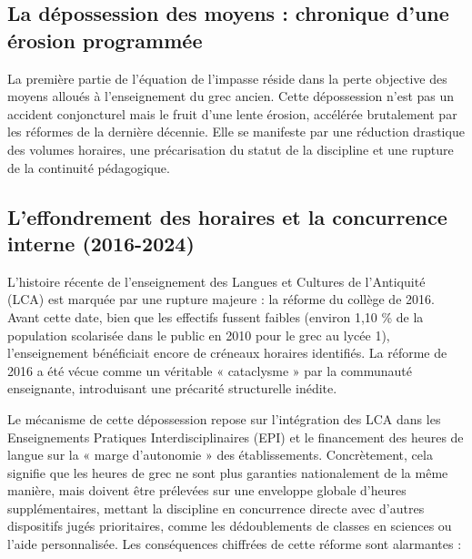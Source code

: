 \subsection{La dépossession des moyens : chronique d'une érosion programmée}

La première partie de l'équation de l'impasse réside dans la perte objective des moyens alloués à
l'enseignement du grec ancien. Cette dépossession n'est pas un accident conjoncturel mais le fruit
d'une lente érosion, accélérée brutalement par les réformes de la dernière décennie. Elle se
manifeste par une réduction drastique des volumes horaires, une précarisation du statut de la
discipline et une rupture de la continuité pédagogique.



\subsection{L'effondrement des horaires et la concurrence interne (2016-2024)}

L'histoire récente de l'enseignement des Langues et Cultures de l'Antiquité (LCA) est marquée par
une rupture majeure : la réforme du collège de 2016. Avant cette date, bien que les effectifs
fussent faibles (environ 1,10 \% de la population scolarisée dans le public en 2010 pour le grec au
lycée 1), l'enseignement bénéficiait encore de créneaux horaires identifiés. La réforme de 2016 a
été vécue comme un véritable « cataclysme » par la communauté enseignante, introduisant une
précarité structurelle inédite.\cite{I-3-3-ref2}

Le mécanisme de cette dépossession repose sur l'intégration des LCA dans les Enseignements Pratiques
Interdisciplinaires (EPI) et le financement des heures de langue sur la « marge d'autonomie » des
établissements. Concrètement, cela signifie que les heures de grec ne sont plus garanties
nationalement de la même manière, mais doivent être prélevées sur une enveloppe globale d'heures
supplémentaires, mettant la discipline en concurrence directe avec d'autres dispositifs jugés
prioritaires, comme les dédoublements de classes en sciences ou l'aide
personnalisée.\cite{I-3-3-ref3} Les conséquences chiffrées de cette réforme sont alarmantes :

